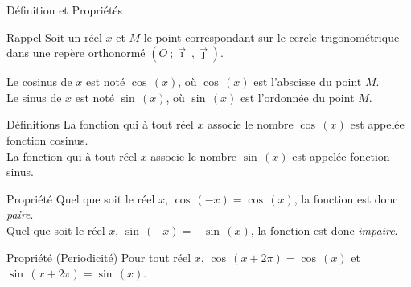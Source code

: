 \documentclass{coursbook}
\begin{document}
    \begin{Gpartie}{Définition et Propriétés} 
        \begin{Spartie}{Rappel} 
            Soit un réel $x$ et $M$ le point correspondant sur le cercle trigonométrique dans une repère orthonormé $\left(O~;\vec{\imath}~,\vec{\jmath}\right)$.

            Le cosinus de $x$ est noté $\cos\,(x)$, où $\cos\,(x)$ est l'abscisse du point $M$. \\
            Le sinus de $x$ est noté $\sin\,(x)$, où $\sin\,(x)$ est l'ordonnée du point $M$.
            
            \begin{center}
                \parbox{\linewidth}{}
            \end{center}
        \end{Spartie}
        \begin{Spartie}{Définitions} 
            La fonction qui à tout réel $x$ associe le nombre $\cos\,(x)$ est appelée fonction cosinus. \\
            La fonction qui à tout réel $x$ associe le nombre $\sin\,(x)$ est appelée fonction sinus.
        \end{Spartie}
        \begin{Spartie}{Propriété} 
            Quel que soit le réel $x$, $\cos\,(-x)=\cos\,(x)$, la fonction est donc \emph{paire}. \\
            Quel que soit le réel $x$, $\sin\,(-x)=-\sin\,(x)$, la fonction est donc \emph{impaire}.
        \end{Spartie}
        \begin{Spartie}{Propriété (Periodicité)} 
            Pour tout réel $x$, $\cos\,(x+2\pi)=\cos\,(x)$ et $\sin\,(x+2\pi)=\sin\,(x)$.


\end{Spartie}
\end{Gpartie}
\end{document}
